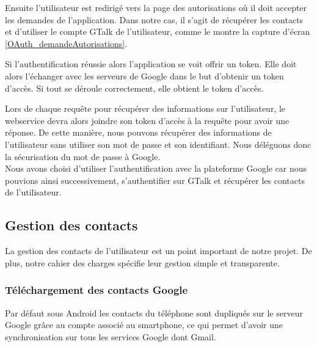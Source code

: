Ensuite l'utilisateur est redirigé vers la page des autorisations où il doit accepter les demandes de l'application.
Dans notre cas, il s'agit de récupérer les contacts et d'utiliser le compte GTalk de l'utilisateur, comme le montre la capture d'écran \ref{OAuth_demandeAutorisations}.

Si l'authentification réussie alors l'application se voit offrir un token.
Elle doit alors l'échanger avec les serveurs de Google dans le but d'obtenir un token d'accès.
Si tout se déroule correctement, elle obtient le token d'accès.

Lors de chaque requête pour récupérer des informations sur l'utilisateur, le webservice devra alors
joindre son token d'accès à la requête pour avoir une réponse. De cette manière, nous pouvons récupérer
des informations de l'utilisateur sans utiliser son mot de passe et son identifiant. Nous déléguons donc
la sécurisation du mot de passe à Google.
\\


Nous avons choisi d'utiliser l'authentification avec la plateforme Google car nous pouvions ainsi 
successivement, s'authentifier sur GTalk et récupérer les contacts de l'utilisateur.




\subsection{Gestion des contacts}

La gestion des contacts de l'utilisateur est un point important de notre projet.
De plus, notre cahier des charges spécifie leur gestion simple et transparente.


\subsubsection{Téléchargement des contacts Google}
\label{Téléchargement des contacts Google}

Par défaut sous Android les contacts du téléphone sont dupliqués sur le serveur Google grâce au compte associé au smartphone, ce qui permet d'avoir une synchronisation sur tous les services Google dont Gmail.

